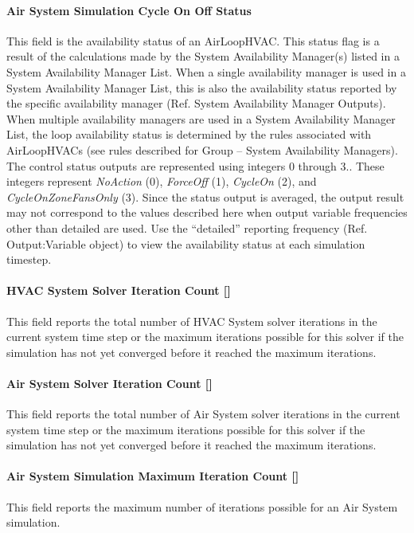 \paragraph{Air System Simulation Cycle On Off Status}\label{air-system-simulation-cycle-on-off-status}

This field is the availability status of an AirLoopHVAC. This status flag is a result of the calculations made by the System Availability Manager(s) listed in a System Availability Manager List. When a single availability manager is used in a System Availability Manager List, this is also the availability status reported by the specific availability manager (Ref. System Availability Manager Outputs). When multiple availability managers are used in a System Availability Manager List, the loop availability status is determined by the rules associated with AirLoopHVACs (see rules described for Group -- System Availability Managers). The control status outputs are represented using integers 0 through 3.. These integers represent \emph{NoAction} (0), \emph{ForceOff} (1), \emph{CycleOn} (2), and \emph{CycleOnZoneFansOnly} (3). Since the status output is averaged, the output result may not correspond to the values described here when output variable frequencies other than detailed are used. Use the ``detailed'' reporting frequency (Ref. Output:Variable object) to view the availability status at each simulation timestep.

\paragraph{HVAC System Solver Iteration Count {[]}}\label{hvac-system-solver-iteration-count}
This field reports the total number of HVAC System solver iterations in the current system time step or the maximum iterations possible for this solver if the simulation has not yet converged before it reached the maximum iterations.

\paragraph{Air System Solver Iteration Count {[]}}\label{air-system-solver-iteration-count}
This field reports the total number of Air System solver iterations in the current system time step or the maximum iterations possible for this solver if the simulation has not yet converged before it reached the maximum iterations.

\paragraph{Air System Simulation Maximum Iteration Count {[]}}\label{air-system-simulation-maximum-iteration-count}
This field reports the maximum number of iterations possible for an Air System simulation.

